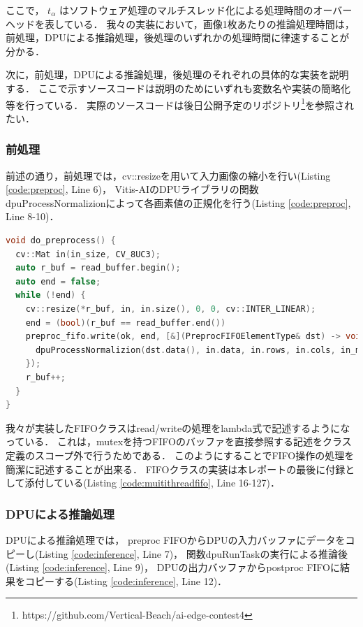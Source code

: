 ここで， $t_\alpha$ はソフトウェア処理のマルチスレッド化による処理時間のオーバーヘッドを表している．
我々の実装において，画像1枚あたりの推論処理時間は，前処理，DPUによる推論処理，後処理のいずれかの処理時間に律速することが分かる．

次に，前処理，DPUによる推論処理，後処理のそれぞれの具体的な実装を説明する．
ここで示すソースコードは説明のためにいずれも変数名や実装の簡略化等を行っている．
実際のソースコードは後日公開予定のリポジトリ\footnote{https://github.com/Vertical-Beach/ai-edge-contest4}を参照されたい．

\subsubsection{前処理}
前述の通り，前処理では，cv::resizeを用いて入力画像の縮小を行い(Listing \ref{code:preproc}, Line 6)，
Vitis-AIのDPUライブラリの関数dpuProcessNormalizionによって各画素値の正規化を行う(Listing \ref{code:preproc}, Line 8-10)．

\setcounter{lstnumber}{1}
\begin{lstlisting}[language=c++,firstnumber=last,caption=do\_preprocess(),label=code:preproc]
void do_preprocess() {
  cv::Mat in(in_size, CV_8UC3);
  auto r_buf = read_buffer.begin();
  auto end = false;
  while (!end) {
    cv::resize(*r_buf, in, in.size(), 0, 0, cv::INTER_LINEAR);
    end = (bool)(r_buf == read_buffer.end())
    preproc_fifo.write(ok, end, [&](PreprocFIFOElementType& dst) -> void {
      dpuProcessNormalizion(dst.data(), in.data, in.rows, in.cols, in_mean, in_scale_fix, in.step1());
    });
    r_buf++;
  }
}
\end{lstlisting}

我々が実装したFIFOクラスはread/writeの処理をlambda式で記述するようになっている．
これは，mutexを持つFIFOのバッファを直接参照する記述をクラス定義のスコープ外で行うためである．
このようにすることでFIFO操作の処理を簡潔に記述することが出来る．
FIFOクラスの実装は本レポートの最後に付録として添付している(Listing \ref{code:muitithreadfifo}, Line 16-127)．

\subsubsection{DPUによる推論処理}
DPUによる推論処理では，
preproc FIFOからDPUの入力バッファにデータをコピーし(Listing \ref{code:inference}, Line 7)，
関数dpuRunTaskの実行による推論後(Listing \ref{code:inference}, Line 9)，
DPUの出力バッファからpostproc FIFOに結果をコピーする(Listing \ref{code:inference}, Line 12)．

